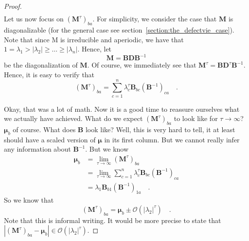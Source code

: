 \documentclass[../../main.tex]{subfiles}
\begin{document}
\begin{proof}
\begin{align*}
    \end{align*}
    Let us now focus on $(\boldsymbol{M}^{\tau})_{ba}$. For simplicity, we consider the case that $\boldsymbol{M}$ is diagonalizable (for the general case see section~\ref{section:the_defectvie_case}). Note that since M is irreducible and aperiodic, we have that $1 = \lambda_1 > |\lambda_2| \geq \dots \geq |\lambda_n|$. Hence, let
    \[
        \boldsymbol{M} = \boldsymbol{BDB}^{-1}
    \]
    be the diagonalization of $\boldsymbol{M}$. Of course, we immediately see that $\boldsymbol{M}^\tau = \boldsymbol{BD}^\tau \boldsymbol{B}^{-1}$. Hence, it is easy to verify that
    \[
        (\boldsymbol{M}^\tau)_{ba} = \sum_{c = 1}^{n} \lambda_c^\tau \boldsymbol{B}_{bc}(\boldsymbol{B}^{-1})_{ca} \quad .
    \]

    \bigskip \noindent
    Okay, that was a lot of math. Now it is a good time to reassure ourselves what we actually have achieved. What do we expect $(\boldsymbol{M}^\tau)_{ba}$ to look like for $\tau \rightarrow \infty$? $\boldsymbol{\mu}_b$ of course. What does $\boldsymbol{B}$ look like? Well, this is very hard to tell, it at least should have a scaled version of $\boldsymbol{\mu}$ in its first column. But we cannot really infer any information about $\boldsymbol{B}^{-1}$. But we know
    \begin{align*}
        \boldsymbol{\mu}_b &= \lim_{\tau \to \infty} (\boldsymbol{M}^\tau)_{ba} \\
        &= \lim_{\tau \to \infty} \sum_{c = 1}^{n} \lambda_c^\tau \boldsymbol{B}_{bc}(\boldsymbol{B}^{-1})_{ca} \\
        &= \lambda_1 \boldsymbol{B}_{b1}(\boldsymbol{B}^{-1})_{1a} \quad .
    \end{align*}
    So we know that
    \[
        (\boldsymbol{M}^\tau)_{ba} = \boldsymbol{\mu}_b \pm \mathcal{O}(|\lambda_2|^\tau) \quad .
    \]
    Note that this is informal writing. It would be more precise to state that $|(\boldsymbol{M}^\tau)_{ba} - \boldsymbol{\mu}_b| \in \mathcal{O}(|\lambda_2|^\tau)$.


\end{proof}
\end{document}
